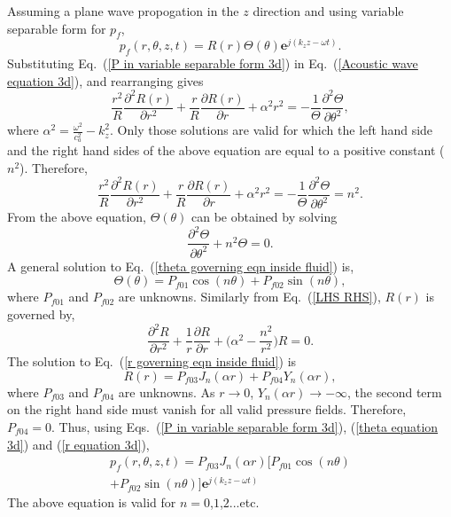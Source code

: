 \documentclass[10pt]{asme2ej}
\begin{document}


Assuming a plane wave propogation in the $z$ direction and using variable separable form for $p_f$,
\begin{equation}\label{P in variable separable form 3d}
    p_{f}(r,\theta,z,t) = R(r)\Theta(\theta) \mathbf{e}^{j(k_{z}z-\omega t)}.
\end{equation}
Substituting Eq.~(\ref{P in variable separable form 3d}) in Eq.~(\ref{Acoustic wave equation 3d}), and rearranging gives 
\begin{equation}
    \frac{r^2}{R}\frac{\partial^{2}R(r)}{\partial r^{2}} + \frac{r}{R}\frac{\partial R(r)}{\partial r} + \alpha^2 r^2 = -\frac{1}{\Theta}\frac{\partial^2 \Theta}{\partial \theta^2},
\end{equation}
where $\alpha^2 = \frac{\omega^{2}}{c_{a}^{2}} - k_{z}^{2}$. Only those solutions are valid for which the left hand side and the right hand sides of the above equation are equal to a positive constant ($n^2$). Therefore,
\begin{equation}\label{LHS RHS}
    \frac{r^2}{R}\frac{\partial^{2}R(r)}{\partial r^{2}} + \frac{r}{R}\frac{\partial R(r)}{\partial r} + \alpha^2 r^2 = -\frac{1}{\Theta}\frac{\partial^2 \Theta}{\partial \theta^2} = n^2.
\end{equation}
From the above equation, $\Theta(\theta)$ can be obtained by solving
\begin{equation}\label{theta governing eqn inside fluid}
    \frac{\partial^2 \Theta}{\partial \theta^2} + n^2\Theta = 0.
\end{equation}
A general solution to Eq.~(\ref{theta governing eqn inside fluid}) is,
\begin{equation}\label{theta equation 3d}
    \Theta(\theta) = P_{f01} \cos(n \theta) + P_{f02} \sin(n \theta),
\end{equation}
where $P_{f01}$ and $P_{f02}$ are unknowns. Similarly from Eq.~(\ref{LHS RHS}), $R(r)$ is governed by,
\begin{equation}\label{r governing eqn inside fluid}
    \frac{\partial^{2}R}{\partial r^{2}} + \frac{1}{r}\frac{\partial R}{\partial r} + \bigg(\alpha^2 - \frac{n^2}{r^2}\bigg)R = 0.
\end{equation}
The solution to Eq.~(\ref{r governing eqn inside fluid}) is
\begin{equation}\label{r equation 3d}
    R(r) = P_{f03} J_n(\alpha r) + P_{f04} Y_n(\alpha r),
\end{equation}
where $P_{f03}$ and $P_{f04}$ are unknowns. As $r \rightarrow 0$, $Y_n(\alpha r) \rightarrow -\infty$, the second term on the right hand side must vanish for all valid pressure fields. Therefore, $P_{f04} = 0$. Thus, using Eqs.~(\ref{P in variable separable form 3d}), (\ref{theta equation 3d}) and (\ref{r equation 3d}),
\begin{multline}\label{P inside 3d untransformed in z,t}
    p_f(r,\theta,z,t) =  P_{f03} J_n(\alpha r)[P_{f01} \cos(n \theta)\\ + P_{f02} \sin(n \theta)]\mathbf{e}^{j(k_{z}z-\omega t)}
\end{multline}
The above equation is valid for $n=0$,$1$,$2$...etc.
\end{document}
